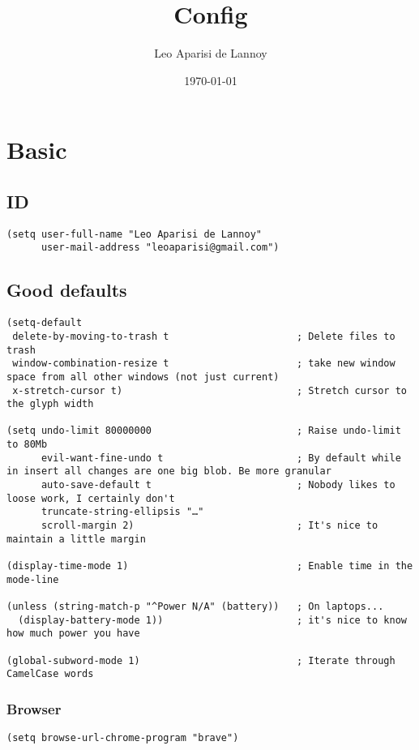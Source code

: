 \documentclass[c]{article}
\author{Leo Aparisi de Lannoy}
\date{\today}
\title{Config}
\theoremstyle{plain}%
\theoremstyle{definition}
\theoremstyle{remark}
\begin{document}
\maketitle
\tableofcontents

\section{Basic}
\label{sec:org4e6fddd}
\subsection{ID}
\label{sec:org998d0de}
\begin{verbatim}
(setq user-full-name "Leo Aparisi de Lannoy"
      user-mail-address "leoaparisi@gmail.com")
\end{verbatim}
\subsection{Good defaults}
\label{sec:orgf64d032}
\begin{verbatim}
(setq-default
 delete-by-moving-to-trash t                      ; Delete files to trash
 window-combination-resize t                      ; take new window space from all other windows (not just current)
 x-stretch-cursor t)                              ; Stretch cursor to the glyph width

(setq undo-limit 80000000                         ; Raise undo-limit to 80Mb
      evil-want-fine-undo t                       ; By default while in insert all changes are one big blob. Be more granular
      auto-save-default t                         ; Nobody likes to loose work, I certainly don't
      truncate-string-ellipsis "…"
      scroll-margin 2)                            ; It's nice to maintain a little margin

(display-time-mode 1)                             ; Enable time in the mode-line

(unless (string-match-p "^Power N/A" (battery))   ; On laptops...
  (display-battery-mode 1))                       ; it's nice to know how much power you have

(global-subword-mode 1)                           ; Iterate through CamelCase words
\end{verbatim}
\subsubsection{Browser}
\label{sec:orge128d9b}
\begin{verbatim}
(setq browse-url-chrome-program "brave")
\end{verbatim}
\end{document}
